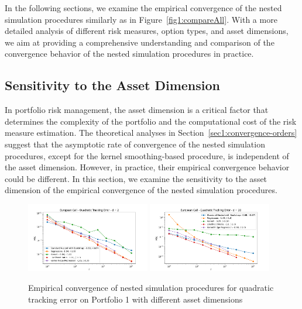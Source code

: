 In the following sections, we examine the empirical convergence of the nested simulation procedures similarly as in Figure~\ref{fig1:compareAll}.
With a more detailed analysis of different risk measures, option types, and asset dimensions, we aim at providing a comprehensive understanding and comparison of the convergence behavior of the nested simulation procedures in practice.

\subsection{Sensitivity to the Asset Dimension} \label{sec1:sensitivity-dimension}
In portfolio risk management, the asset dimension is a critical factor that determines the complexity of the portfolio and the computational cost of the risk measure estimation.
The theoretical analyses in Section~\ref{sec1:convergence-orders} suggest that the asymptotic rate of convergence of the nested simulation procedures, except for the kernel smoothing-based procedure, is independent of the asset dimension.
However, in practice, their empirical convergence behavior could be different.
In this section, we examine the sensitivity to the asset dimension of the empirical convergence of the nested simulation procedures.

\begin{figure}[ht!]
    \centering
    \includegraphics[width=0.48\textwidth]{./project1/figures/figure2a.png}
    \includegraphics[width=0.48\textwidth]{./project1/figures/figure2b.png}
    \caption{Empirical convergence of nested simulation procedures for quadratic tracking error on Portfolio 1 with different asset dimensions}
    \label{fig1:assetDimension} 
\end{figure}

